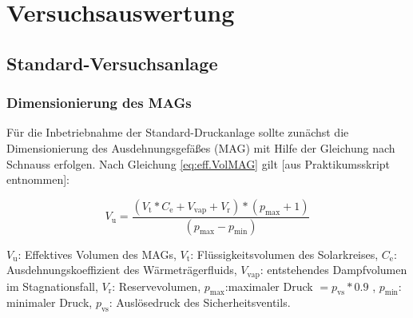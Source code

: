\section{Versuchsauswertung}

\subsection{Standard-Versuchsanlage} 

\subsubsection{Dimensionierung des MAGs}
Für die Inbetriebnahme der Standard-Druckanlage sollte zunächst die Dimensionierung des Ausdehnungsgefäßes (MAG) mit Hilfe der Gleichung nach Schnauss erfolgen. Nach Gleichung \eqref{eq:eff.VolMAG} gilt [aus Praktikumsskript entnommen]: 

\begin{equation}
\label{eq:eff.VolMAG}
V_{\text{u}}= \frac{(V_{\text{t}} * C_{\text{e}} + V_{\text{vap}} + V_{\text{r}})*(p_{\text{max}} + 1)}{(p_{\text{max}}-p_{\text{min}})}
\end{equation}

\begin{center}
	\begin{small}
		$V_{\text{u}}$: Effektives Volumen des MAGs,
		$V_{\text{t}}$: Flüssigkeitsvolumen des Solarkreises,
		$C_{\text{e}}$: Ausdehnungskoeffizient des Wärmeträgerfluids,
		$V_{\text{vap}}$: entstehendes Dampfvolumen im Stagnationsfall,
		$V_\text{r}$: Reservevolumen,
		$p_{\text{max}}$:maximaler Druck $=p_{\text{vs}}*\num{0,9}$ ,
		$p_{\text{min}}$: minimaler Druck,
		$p_{\text{vs}}$: Auslösedruck des Sicherheitsventils.
	\end{small}
\end{center}

